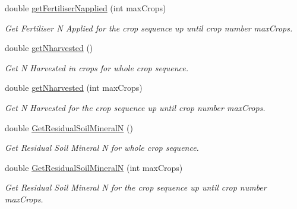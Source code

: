 \begin{DoxyCompactItemize}
\mbox{\label{class_crop_sequence_class_a70461a9368b16ddaed83a1938321a02b}} 
double \mbox{\hyperlink{class_crop_sequence_class_a70461a9368b16ddaed83a1938321a02b}{get\+Fertiliser\+Napplied}} (int max\+Crops)
\begin{DoxyCompactList}\small\item\em Get Fertiliser N Applied for the crop sequence up until crop number max\+Crops. \end{DoxyCompactList}\item 
\mbox{\label{class_crop_sequence_class_a4c9e7270b6302c4458acde8c07c378c1}} 
double \mbox{\hyperlink{class_crop_sequence_class_a4c9e7270b6302c4458acde8c07c378c1}{get\+Nharvested}} ()
\begin{DoxyCompactList}\small\item\em Get N Harvested in crops for whole crop sequence. \end{DoxyCompactList}\item 
\mbox{\label{class_crop_sequence_class_a382d9bf27f83833304ded5881aeb5534}} 
double \mbox{\hyperlink{class_crop_sequence_class_a382d9bf27f83833304ded5881aeb5534}{get\+Nharvested}} (int max\+Crops)
\begin{DoxyCompactList}\small\item\em Get N Harvested for the crop sequence up until crop number max\+Crops. \end{DoxyCompactList}\item 
\mbox{\label{class_crop_sequence_class_a3401eac2451cc44771fdd81889e201c2}} 
double \mbox{\hyperlink{class_crop_sequence_class_a3401eac2451cc44771fdd81889e201c2}{Get\+Residual\+Soil\+MineralN}} ()
\begin{DoxyCompactList}\small\item\em Get Residual Soil Mineral N for whole crop sequence. \end{DoxyCompactList}\item 
\mbox{\label{class_crop_sequence_class_a2347aff3c6945f3394ba5ca4ec8ea204}} 
double \mbox{\hyperlink{class_crop_sequence_class_a2347aff3c6945f3394ba5ca4ec8ea204}{Get\+Residual\+Soil\+MineralN}} (int max\+Crops)
\begin{DoxyCompactList}\small\item\em Get Residual Soil Mineral N for the crop sequence up until crop number max\+Crops. \end{DoxyCompactList}\item 

\end{DoxyCompactItemize}
